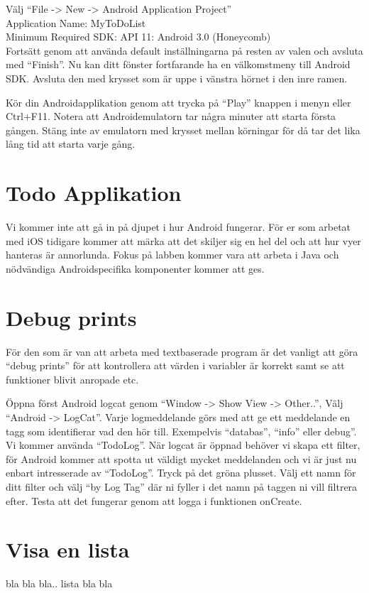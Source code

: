 \documentclass[11 pt]{article} %
\begin{document}
Välj “File -> New -> Android Application Project”\\ 
Application Name:  MyToDoList\\
Minimum Required SDK:  API 11: Android 3.0 (Honeycomb)\\
Fortsätt genom att använda default inställningarna på resten av valen och avsluta med “Finish”. 
Nu kan ditt fönster fortfarande ha en välkomstmeny till Android SDK. 
Avsluta den med krysset som är uppe i vänstra hörnet i den inre ramen.

Kör din Androidapplikation genom att trycka på “Play” knappen i menyn eller Ctrl+F11. 
Notera att Androidemulatorn tar några minuter att starta första gången. 
Stäng inte av emulatorn med krysset mellan körningar för då tar det lika lång tid att starta varje gång.

\section{Todo Applikation}
Vi kommer inte att gå in på djupet i hur Android fungerar. 
För er som arbetat med iOS tidigare kommer att märka att det skiljer sig en hel del och att hur vyer hanteras är annorlunda. 
Fokus på labben kommer vara att arbeta i Java och nödvändiga Androidspecifika komponenter kommer att ges.
\section{Debug prints}
För den som är van att arbeta med textbaserade program är det vanligt att göra “debug prints” för att kontrollera att värden i variabler är korrekt samt se att funktioner blivit anropade etc.

Öppna först Android logcat genom “Window -> Show View -> Other..”, Välj “Android -> LogCat”.
Varje logmeddelande görs med att ge ett meddelande en tagg som identifierar vad den hör till. 
Exempelvis “databas”, “info” eller debug”. 
Vi kommer använda “TodoLog”. 
När logcat är öppnad behöver vi skapa ett filter, för Android kommer att spotta ut väldigt mycket meddelanden och vi är just nu enbart intresserade av “TodoLog”. 
Tryck på det gröna plusset.
Välj ett namn för ditt filter och välj “by Log Tag” där ni fyller i det namn på taggen ni vill filtrera efter.
Testa att det fungerar genom att logga i funktionen onCreate.


\section{Visa en lista}
bla bla bla.. lista bla bla
\end{document}
